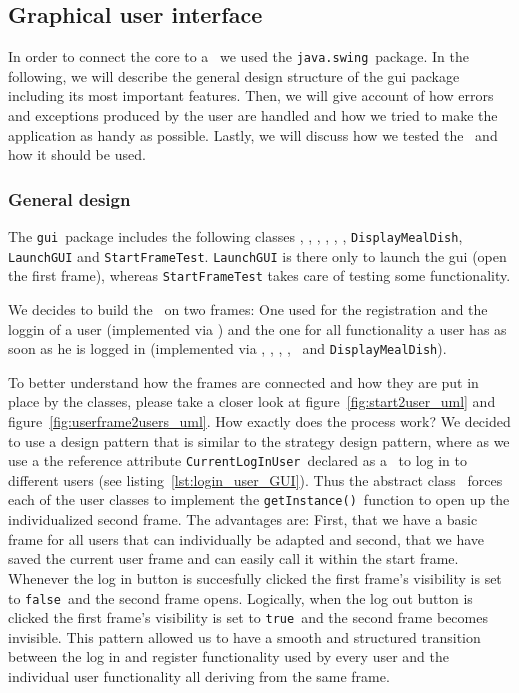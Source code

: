 \subsection{Graphical user interface} %
\label{sub:graphical_user_interface}

In order to connect the core to a \GUI~we used the \lstinline|java.swing|~package.
In the following, we will describe the general design structure of the gui package including 
its most important features. Then, we will give account of how errors and exceptions produced 
by the user are handled and how we tried to make the application as handy as possible. 
Lastly, we will discuss how we tested the \GUI~and how it should be used.

\subsubsection{General design} %
\label{ssub:general_design}

The \lstinline|gui|~package includes the following classes
\StFra, \UserF, \CourF, \RestF, \ManagF,  \CustF, \lstinline|DisplayMealDish|, \lstinline|LaunchGUI| and 
\lstinline|StartFrameTest|. 
\lstinline|LaunchGUI| is there only to launch the gui (open the first frame), whereas 
\lstinline|StartFrameTest| takes care of testing some functionality.

We decides to build the \GUI~on two frames: One used for the registration and the loggin of a user
 (implemented via \StFra)
and the one for all functionality a user has as soon as he is logged in (implemented via  
\UserF, \RestF, \ManagF, \CourF, \CustF~and \lstinline|DisplayMealDish|). 

To better understand how the frames are connected and how they are put in place by the classes, 
please take a closer look at figure~\ref{fig:start2user_uml} and figure~\ref{fig:userframe2users_uml}.
How exactly does the process work?
We decided to use a design pattern that is similar to the strategy design pattern, where as we use a 
the reference attribute \lstinline|CurrentLogInUser|~declared as a \UserF~to log in to different 
users (see listing~\ref{lst:login_user_GUI}). Thus the abstract class \UserF~forces each of the user 
classes to implement the \lstinline|getInstance()|~function to open up the individualized second frame. 
The advantages are: First, that we have a basic frame 
for all users that can individually be adapted and second, that we have saved the current user frame 
and can easily call it within the start frame. 
Whenever the log in button is succesfully clicked the first frame's visibility is set to 
\lstinline|false|~and the second frame opens. Logically, when the log out button is clicked the first 
frame's visibility is set to \lstinline|true|~and the second frame becomes invisible. 
This pattern allowed us to have a smooth and structured transition between the log in and register 
functionality used by every user and the individual user functionality all deriving from the same 
frame.

